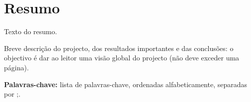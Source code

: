 \documentclass[a4paper,openright,twoside,11pt]{report}
\begin{document}
\cleardoublepage\newpage
\chapter*{Resumo}
Texto do resumo.

Breve descrição do projecto, dos resultados importantes e das conclusões: o objectivo é dar ao leitor uma visão global do projecto (não deve exceder uma página). 

{\bf Palavras-chave:} lista de palavras-chave, ordenadas alfabeticamente, separadas por ;.

%


\cleardoublepage\newpage
\tableofcontents
\cleardoublepage

\listoffigures
\cleardoublepage

\listoftables
\cleardoublepage

\setcounter{page}{1}

%

%

%

%

%




\appendix

%

%
\end{document}
